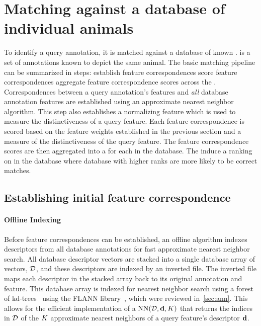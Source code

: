 \section{Matching against a database of individual animals}\label{sec:baselineranking}

    To identify a query annotation, it is matched against a database of
      known \names{}.
    \Aan{\name{}} is a set of annotations known to depict the same
      animal.
    The basic matching pipeline can be summarized in \three{} steps:
    establish feature correspondences \rpipe{} %
    score feature correspondences \rpipe{} %
    aggregate feature correspondence scores across the \names{}.
    Correspondences between a query annotation's features and
      \emph{all} database annotation features are established using an
      approximate nearest neighbor algorithm.
    This step also establishes a normalizing feature which is used to
      measure the distinctiveness of a query feature.
    Each feature correspondence is scored based on the feature weights
      established in the previous section and a measure of the
      distinctiveness of the query feature.
    The feature correspondence scores are then aggregated into a
      \glossterm{\namescore{}} for each \name{} in the database.
    The \namescores{} induce a ranking on \names{} in the database
      where database \names{} with higher ranks are more likely to be
      correct matches.

   \subsection{Establishing initial feature correspondence}\label{sub:featmatch}

        \paragraph{Offline Indexing}
            Before feature correspondences can be established, an
              offline algorithm indexes descriptors from all database
              annotations for fast approximate nearest neighbor search.
            All database descriptor vectors are stacked into a single
              database array of vectors, %
            $\mathcal{D}$, %
            and these descriptors are indexed by an inverted file.
            The inverted file maps each descriptor in the stacked array
              back to its original annotation and feature.
            This database array is indexed for nearest neighbor search
              using a forest of kd-trees~\cite{silpaanan_optimised_2008}
              using the FLANN library~\cite{muja_fast_2009}, which were
              reviewed in~\cref{sec:ann}.
            This allows for the efficient implementation of a
            $\operatorname{NN}(\mathcal{D}, \mathbf{d}, K)$  %
            that returns the indices in $\mathcal{D}$ of the $K$
              approximate nearest neighbors of a query feature's
              descriptor $\mathbf{d}$.

